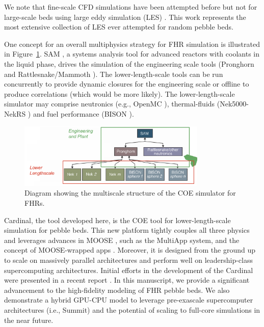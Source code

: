 We note that fine-scale CFD simulations have been attempted before but not for large-scale beds using large eddy simulation (LES) \cite{vanstaden2018}. This work represents the most extensive collection of LES ever attempted for random pebble beds.

One concept for an overall multiphysics strategy for FHR simulation is illustrated in Figure~\ref{f:fhr1}. SAM \cite{hu2017sam}, a systems analysis tool for advanced reactors with coolants in the liquid phase, drives the simulation of the engineering scale tools (Pronghorn and Rattlesnake/Mammoth \cite{wang1}). The lower-length-scale tools can be run concurrently to provide dynamic closures for the engineering scale or offline to produce correlations (which would be more likely). The lower-length-scale simulator may comprise neutronics (e.g., OpenMC \cite{romano2013openmc}), thermal-fluids (Nek5000-NekRS \cite{fischer2008}) and fuel performance (BISON \cite{hales2013triso}).

\begin{figure}[!h]
\centering
\includegraphics[clip=true,width=0.8\textwidth]{Figures/fhr_graph}
\caption{Diagram showing the multiscale structure of the COE simulator for FHRs.}
\label{f:fhr1}
\end{figure}

Cardinal, the tool developed here, is the COE tool for lower-length-scale simulation for pebble beds. This new platform tightly couples all three physics and leverages advances in MOOSE \cite{gaston2009moose, permann2020moose}, such as the MultiApp system, and the concept of MOOSE-wrapped apps \cite{gaston2015physics}. Moreover, it is designed from the ground up to scale on massively parallel architectures and perform well on leadership-class supercomputing architectures. Initial efforts in the development of the Cardinal were presented in a recent report \cite{cardinal}. In this manuscript, we provide a significant advancement to the high-fidelity modeling of FHR pebble beds. We also demonstrate a hybrid GPU-CPU model to leverage pre-exascale supercomputer architectures (i.e., Summit) and the potential of scaling to full-core simulations in the near future.

